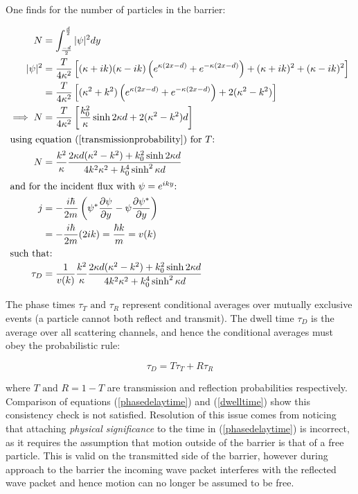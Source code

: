 \documentclass{article}
\begin{document}
\noindent One finds for the number of particles in the barrier:

\begin{align}
	N&=\int_{\frac{-d}{2}}^{\frac{d}{2}}|\psi|^2dy \\
	|\psi|^2 &= \frac{T}{4\kappa^2}\left[(\kappa+ik)(\kappa-ik)\left(e^{\kappa(2x-d)}+e^{-\kappa(2x-d)}\right)+(\kappa+ik)^2+(\kappa-ik)^2\right] \\
		 &= \frac{T}{4\kappa^2}\left[(\kappa^2+k^2)\left(e^{\kappa(2x-d)}+e^{-\kappa(2x-d)}\right)+2(\kappa^2-k^2)\right] \\
	\implies N &= \frac{T}{4\kappa^2}\left[\frac{k_0^2}{\kappa}\sinh{2\kappa d}+2(\kappa^2-k^2)d\right] \\ \intertext{using equation (\ref{transmissionprobability}) for $T$:}
		 N &= \frac{k^2}{\kappa}\frac{2\kappa d(\kappa^2-k^2)+k_0^2\sinh{2\kappa d}}{4k^2\kappa^2+k_0^4\sinh^2{\kappa d}}\\ \intertext{and for the incident flux with $\psi = e^{iky}$:
}
	j &= -\frac{i\hbar}{2m}\left(\psi^{*}\frac{\partial\psi}{\partial y}-\psi \frac{\partial \psi^{*}}{\partial y}\right) \\ 
	  &= -\frac{i\hbar}{2m}(2ik) = \frac{\hbar k}{m} = v(k) \\ \intertext{such that:}
	\tau_D &= \frac{1}{v(k)}\frac{k^2}{\kappa}\frac{2\kappa d(\kappa^2-k^2)+k_0^2\sinh{2\kappa d}}{4k^2\kappa^2+k_0^4\sinh^2{\kappa d}}
	\label{dwelltime}
\end{align}

\noindent The phase times $\tau_T \text{ and } \tau_R$ represent conditional averages over mutually exclusive events (a particle cannot both reflect and transmit). The dwell time $\tau_D$ is the average over all scattering channels, and hence the conditional averages must obey the probabilistic rule:

\begin{equation}
	\tau_D = T\tau_T+R\tau_R
\end{equation}

\noindent where $T \text{ and } R = 1-T$ are transmission and reflection probabilities respectively. Comparison of equations (\ref{phasedelaytime}) and (\ref{dwelltime}) show this consistency check is not satisfied. Resolution of this issue comes from noticing that attaching \textit{physical significance} to the time in (\ref{phasedelaytime}) is incorrect, as it requires the assumption that motion outside of the barrier is that of a free particle. This is valid on the transmitted side of the barrier, however during approach to the barrier the incoming wave packet interferes with the reflected wave packet and hence motion can no longer be assumed to be free.
\end{document}
